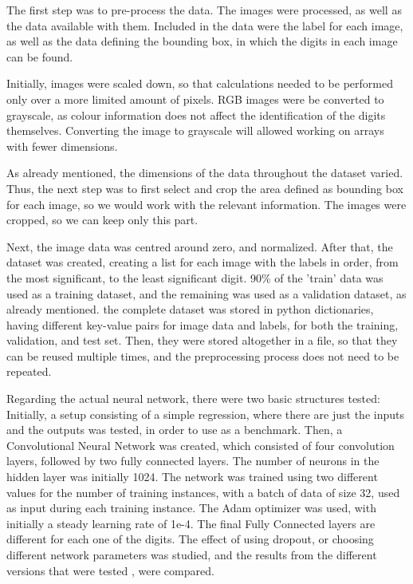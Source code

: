 \documentclass[final,12p,times]{elsarticle}
\begin{document}
\begin{Itemize}
The first step was to pre-process the data.
The images were processed, as well as the data available with them.
Included in the data were the label for each image, as well as the data defining the bounding box, in which the digits in each image can be found.

Initially, images were scaled down, so that calculations needed to be performed only over a more limited amount of pixels.
RGB images were be converted to grayscale, as colour information does not affect the identification of the digits themselves.
Converting the image to grayscale will allowed working on arrays with fewer dimensions.

As already mentioned, the dimensions of the data throughout the dataset varied.
Thus, the next step was to first select and crop the area defined as bounding box for each image, so we would work with the relevant information.
The images were cropped, so we can keep only this part.

Next, the image data was centred around zero, and normalized.
After that, the dataset was created, creating a list for each image with the labels in order, from the most significant, to the least significant digit.
90\% of the 'train' data was used as a training dataset, and the remaining was used as a validation dataset, as already mentioned.
the complete dataset was stored in python dictionaries, having different key-value pairs for image data and labels, for both the training, validation, and test set.
Then, they were stored altogether in a file, so that they can be reused multiple times, and the preprocessing process does not need to be repeated.

Regarding the actual neural network, there were two basic structures tested:
Initially, a setup consisting of a simple regression, where there are just the inputs and the outputs was tested, in order to use as a benchmark.
Then, a Convolutional Neural Network was created, which consisted of four convolution layers, followed by two fully connected layers.
The number of neurons in the hidden layer was initially 1024.
The network was trained using two different values for the number of training instances, with a batch of data of size 32, used as input during each training instance.
The Adam optimizer was used, with initially a steady learning rate of 1e-4.
The final Fully Connected layers are different for each one of the digits.
The effect of using dropout, or choosing different network parameters was studied, and the results from the different versions that were tested , were compared.


\end{Itemize}
\end{document}
